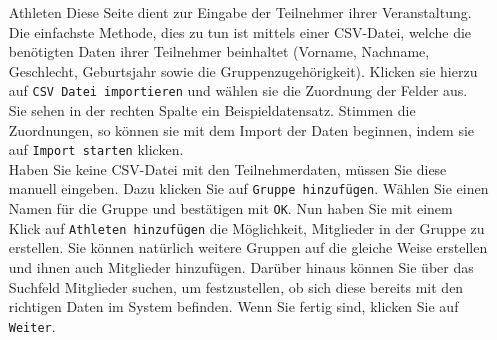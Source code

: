 \documentclass[11pt,a4paper,titlepage,german]{article}
\begin{document}
\begin{enumerate}
\begin{enumerate}
						\item[Athleten] Diese Seite dient zur Eingabe der Teilnehmer ihrer Veranstaltung. Die einfachste Methode, dies zu tun ist mittels einer CSV-Datei, welche die benötigten Daten ihrer Teilnehmer beinhaltet (Vorname, Nachname, Geschlecht, Geburtsjahr sowie die Gruppenzugehörigkeit). Klicken sie hierzu auf \texttt{CSV Datei importieren} und wählen sie die Zuordnung der Felder aus. Sie sehen in der rechten Spalte ein Beispieldatensatz. Stimmen die Zuordnungen, so können sie mit dem Import der Daten beginnen, indem sie auf \texttt{Import starten} klicken.\\
						Haben Sie keine CSV-Datei mit den Teilnehmerdaten, müssen Sie diese manuell eingeben. Dazu klicken Sie auf \texttt{Gruppe hinzufügen}. Wählen Sie einen Namen für die Gruppe und bestätigen mit \texttt{OK}. Nun haben Sie mit einem Klick auf \texttt{Athleten hinzufügen} die Möglichkeit, Mitglieder in der Gruppe zu erstellen. Sie können natürlich weitere Gruppen auf die gleiche Weise erstellen und ihnen auch Mitglieder hinzufügen. Darüber hinaus können Sie über das  Suchfeld Mitglieder suchen, um festzustellen, ob sich diese bereits mit den richtigen Daten im System befinden. Wenn Sie fertig sind, klicken Sie auf \texttt{Weiter}.
						

\end{enumerate}
\end{enumerate}
\end{document}
